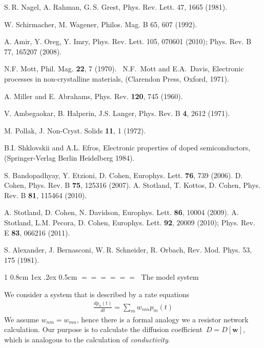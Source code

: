 \documentclass[onecolumn,fleqn,notitlepage,secnumarabic]{revtex4}
\makeatletter
\newcommand{\beq}{\begin{eqnarray}}
\newcommand{\eeq}{\end{eqnarray}}
\def\section{%
  \@startsection
    {section}%
    {1}%
    {\z@}%
    {0.8cm \@plus1ex \@minus .2ex}%
    {0.5cm}%
    {\Large\bf $=\!=\!=\!=\!=\!=\;$}%
}%
\makeatother
\begin{document}
\begin{thebibliography}{99}



S. R. Nagel, A. Rahman, G. S. Grest, 
Phys. Rev. Lett. 47, 1665 (1981).

W. Schirmacher, M. Wagener, 
Philos. Mag. B 65, 607 (1992).


A. Amir, Y. Oreg, Y. Imry,
Phys. Rev. Lett. 105, 070601 (2010); 
%
Phys. Rev. B 77, 165207 (2008).



N.F. Mott, Phil. Mag. {\bf 22}, 7 (1970). 
\ N.F.~Mott and E.A.~Davis, 
Electronic processes in non-crystalline materials, 
(Clarendon Press, Oxford, 1971). 

A. Miller and E. Abrahams, Phys. Rev. {\bf 120}, 745 (1960).

V. Ambegaokar, B. Halperin, J.S. Langer, 
Phys. Rev. B {\bf 4}, 2612 (1971). 

M. Pollak, J. Non-Cryst. Solids {\bf 11}, 1 (1972).

B.I. Shklovskii and A.L. Efros, 
Electronic properties of doped semiconductors,
(Springer-Verlag Berlin Heidelberg 1984).



%
S. Bandopadhyay, Y. Etzioni, D. Cohen,
Europhys. Lett. {\bf 76}, 739 (2006).
%
D. Cohen,
Phys. Rev. B {\bf 75}, 125316 (2007).
%
A. Stotland, T. Kottos, D. Cohen, 
Phys. Rev. B {\bf 81}, 115464 (2010). 


%
A. Stotland, D. Cohen, N. Davidson, 
Europhys. Lett. {\bf 86}, 10004 (2009).
%
A. Stotland, L.M. Pecora, D. Cohen, 
Europhys. Lett. {\bf 92}, 20009 (2010);
Phys. Rev. E {\bf 83}, 066216 (2011).


S. Alexander, J. Bernasconi, W. R. Schneider, R. Orbach, 
Rev. Mod. Phys. 53, 175 (1981).


\end{thebibliography}



\section{The model system}


We consider a system that is described by a rate equations 
%
\beq
\frac{dp_n(t)}{dt} = \sum_m w_{nm} p_m(t)
\eeq
%
We assume $w_{nm}=w_{mn}$, hence there is a formal analogy 
we a resistor network calculation. Our purpose is to calculate 
the diffusion coefficient~$D=D[\bm{w}]$, which is analogous to the 
calculation of {\em conductivity}.
\end{document}

